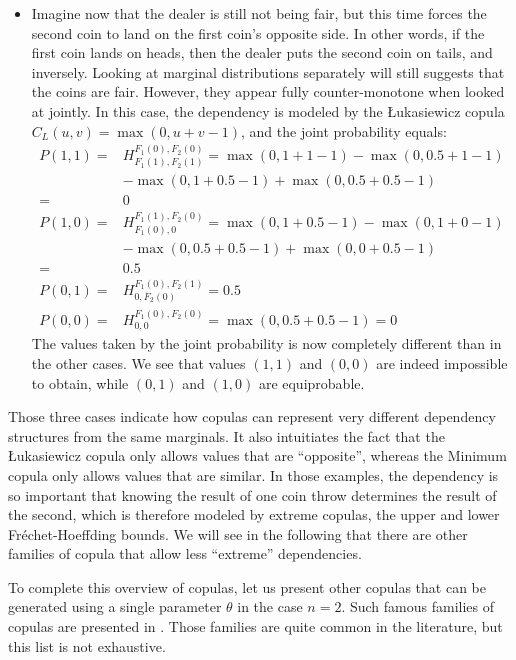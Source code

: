 \begin{example}
\begin{itemize}
		\item Imagine now that the dealer is still not being fair, but this time forces the second coin to land on the first coin's opposite side. In other words, if the first coin lands on heads, then the dealer puts the second coin on tails, and inversely. Looking at marginal distributions separately will still suggests that the coins are fair. However, they appear fully counter-monotone when looked at jointly. In this case, the dependency is modeled by the \L ukasiewicz copula $C_L(u,v)=\max(0,u+v-1)$, and the joint probability equals:
		\begin{align*}
            P(1,1) =& H_{F_1(1), F_2(1)}^{F_1(0), F_2(0)} = \max(0, 1+1-1) - \max(0, 0.5+1-1)\\
            &- \max(0, 1+0.5-1) + \max(0, 0.5+0.5-1)\\
            =& 0\\
            P(1,0) =& H_{F_1(0), 0}^{F_1(1), F_2(0)} =\max(0, 1+0.5-1) - \max(0, 1+0-1)\\
            &- \max(0, 0.5+0.5-1) + \max(0, 0+0.5-1)\\
            =& 0.5\\
            P(0,1) =& H_{0, F_2(0)}^{F_1(0), F_2(1)} = 0.5 \\
            P(0,0) =& H_{0, 0}^{F_1(0), F_2(0)} = \max(0, 0.5+0.5-1)=0
        \end{align*}
        The values taken by the joint probability is now completely different than in the other cases. We see that values $(1,1)$ and $(0,0)$ are indeed impossible to obtain, while $(0,1)$ and $(1,0)$ are equiprobable.
	\end{itemize}
	Those three cases indicate how copulas can represent very different dependency structures from the same marginals. It also intuitiates the fact that the \L ukasiewicz copula only allows values that are ``opposite'', whereas the Minimum copula only allows values that are similar. In those examples, the dependency is so important that knowing the result of one coin throw determines the result of the second, which is therefore modeled by extreme copulas, \ie the upper and lower Fréchet-Hoeffding bounds.  We will see in the following that there are other families of copula that allow less ``extreme'' dependencies.
\end{example}

To complete this overview of copulas, let us present other copulas that can be generated using a single parameter $\theta$ in the case $n=2$. Such famous families of copulas are presented in . Those families are quite common in the literature, but this list is not exhaustive.

